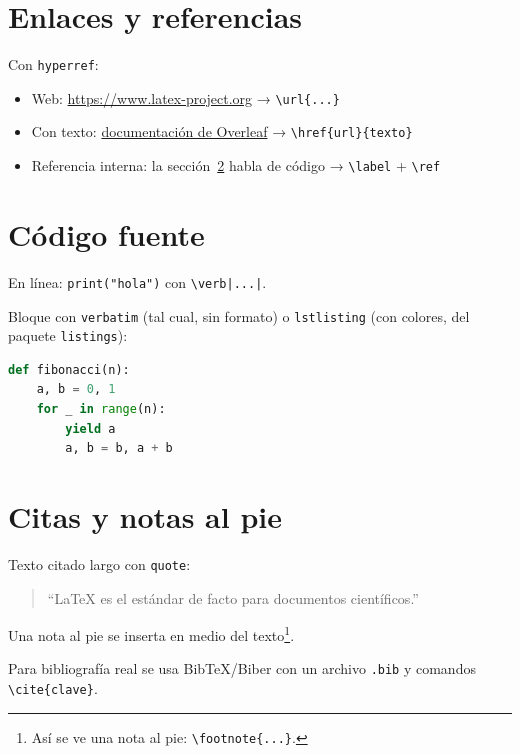 \section{Enlaces y referencias}
Con \texttt{hyperref}:
\begin{itemize}
  \item Web: \url{https://www.latex-project.org} → \texttt{\textbackslash url\{...\}}
  \item Con texto: \href{https://www.overleaf.com/learn}{documentación de Overleaf}
        → \texttt{\textbackslash href\{url\}\{texto\}}
  \item Referencia interna: la sección~\ref{sec:codigo} habla de código
        → \texttt{\textbackslash label} + \texttt{\textbackslash ref}
\end{itemize}

\section{Código fuente}
\label{sec:codigo}
En línea: \verb|print("hola")| con \texttt{\textbackslash verb|...|}.

Bloque con \texttt{verbatim} (tal cual, sin formato) o \texttt{lstlisting}
(con colores, del paquete \texttt{listings}):
\begin{lstlisting}[language=Python]
def fibonacci(n):
    a, b = 0, 1
    for _ in range(n):
        yield a
        a, b = b, a + b
\end{lstlisting}

\section{Citas y notas al pie}
Texto citado largo con \texttt{quote}:
\begin{quote}
  ``LaTeX es el estándar de facto para documentos científicos.''
\end{quote}

Una nota al pie se inserta en medio del texto\footnote{Así se ve una
nota al pie: \texttt{\textbackslash footnote\{...\}}.}.

Para bibliografía real se usa BibTeX/Biber con un archivo \texttt{.bib}
y comandos \texttt{\textbackslash cite\{clave\}}.

